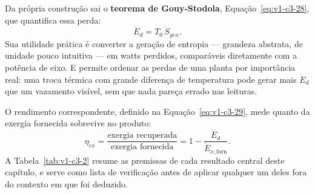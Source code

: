 \documentclass[12pt,a4paper]{article}
\numberwithin{equation}{section}
\numberwithin{table}{section}
\numberwithin{figure}{section}
\begin{document}
Da própria construção sai o \textbf{teorema de Gouy-Stodola},
Equação~\eqref{eq:v1-c3-28}, que quantifica essa perda:
\begin{equation}\label{eq:v1-c3-28}
\dot{E}_d = T_0 \, \dot{S}_{gen} .
\end{equation}
Sua utilidade prática é converter a geração de entropia --- grandeza abstrata,
de unidade pouco intuitiva --- em watts perdidos, comparáveis diretamente com a
potência de eixo. E permite ordenar as perdas de uma planta por importância
real: uma troca térmica com grande diferença de temperatura pode gerar mais
$\dot{E}_d$ que um vazamento visível, sem que nada pareça errado nas leituras.

O rendimento correspondente, definido na Equação~\eqref{eq:v1-c3-29}, mede
quanto da exergia fornecida sobrevive no produto:
\begin{equation}\label{eq:v1-c3-29}
\eta_{ex} = \frac{\text{exergia recuperada}}{\text{exergia fornecida}}
= 1 - \frac{\dot{E}_d}{\dot{E}_{x,\text{forn}}} .
\end{equation}
A Tabela~\ref{tab:v1-c3-2} resume as premissas de cada resultado central deste
capítulo, e serve como lista de verificação antes de aplicar qualquer um deles
fora do contexto em que foi deduzido.

\begin{table}[H]
\centering
\caption[Premissas dos resultados do capítulo]{Resultados centrais do capítulo
e as premissas de que dependem.}
\label{tab:v1-c3-2}
\small
{}
\end{table}
\end{document}
